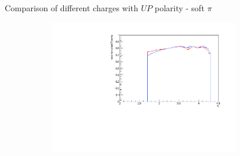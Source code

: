 \documentclass[11pt]{beamer}
\begin{document}
\begin{frame}{Comparison of different charges with $UP$ polarity - soft $\pi$}
\begin{figure}
\begin{subfigure}{0.45\textwidth}
\end{subfigure}
\begin{subfigure}{0.45\textwidth}
\includegraphics[width=0.9\textwidth]{third/up_pdf/combined/h_eta_reco_SPi.pdf}
\end{subfigure}
\end{figure}
\end{frame}
\end{document}
